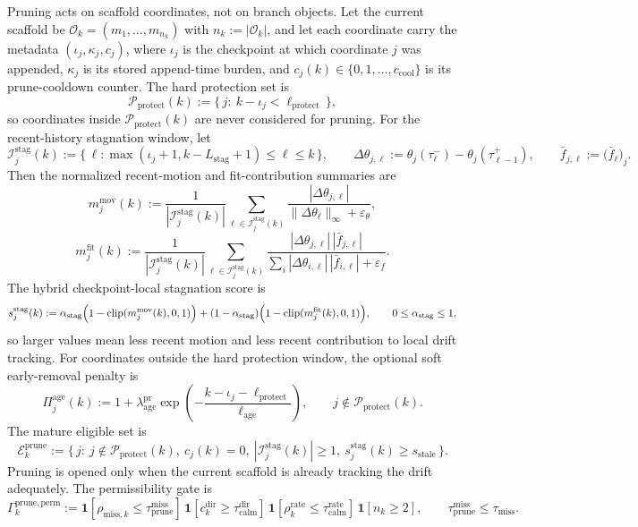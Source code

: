 \documentclass[11pt]{article}
\begin{document}
Pruning acts on scaffold coordinates, not on branch objects. Let the current scaffold be \(\mathcal O_k=(m_1,\dots,m_{n_k})\) with \(n_k:=|\mathcal O_k|\), and let each coordinate carry the metadata \((\iota_j,\kappa_j,c_j)\), where \(\iota_j\) is the checkpoint at which coordinate \(j\) was appended, \(\kappa_j\) is its stored append-time burden, and \(c_j(k)\in\{0,1,\dots,c_{\mathrm{cool}}\}\) is its prune-cooldown counter. The hard protection set is
\[
\mathcal P_{\mathrm{protect}}(k)
:=
\{\,j:\ k-\iota_j<\ell_{\mathrm{protect}}\,\},
\]
so coordinates inside \(\mathcal P_{\mathrm{protect}}(k)\) are never considered for pruning. For the recent-history stagnation window, let
\[
\mathcal I_j^{\mathrm{stag}}(k)
:=
\{\,\ell:\max(\iota_j+1,k-L_{\mathrm{stag}}+1)\le \ell\le k\,\},
\qquad
\Delta\theta_{j,\ell}
:=
\theta_j(\tau_\ell^-)-\theta_j(\tau_{\ell-1}^+),
\qquad
\bar f_{j,\ell}
:=
\bigl(\bar f_\ell\bigr)_j.
\]
Then the normalized recent-motion and fit-contribution summaries are
\[
m_j^{\mathrm{mov}}(k)
:=
\frac{1}{|\mathcal I_j^{\mathrm{stag}}(k)|}
\sum_{\ell\in\mathcal I_j^{\mathrm{stag}}(k)}
\frac{|\Delta\theta_{j,\ell}|}{\|\Delta\theta_\ell\|_\infty+\varepsilon_\theta},
\]
\[
m_j^{\mathrm{fit}}(k)
:=
\frac{1}{|\mathcal I_j^{\mathrm{stag}}(k)|}
\sum_{\ell\in\mathcal I_j^{\mathrm{stag}}(k)}
\frac{|\Delta\theta_{j,\ell}|\,|\bar f_{j,\ell}|}{\sum_i |\Delta\theta_{i,\ell}|\,|\bar f_{i,\ell}|+\varepsilon_f}.
\]
The hybrid checkpoint-local stagnation score is
\[
s_j^{\mathrm{stag}}(k)
:=
\alpha_{\mathrm{stag}}
\Bigl(1-\operatorname{clip}(m_j^{\mathrm{mov}}(k),0,1)\Bigr)
+
(1-\alpha_{\mathrm{stag}})
\Bigl(1-\operatorname{clip}(m_j^{\mathrm{fit}}(k),0,1)\Bigr),
\qquad
0\le \alpha_{\mathrm{stag}}\le 1,
\]
so larger values mean less recent motion and less recent contribution to local drift tracking. For coordinates outside the hard protection window, the optional soft early-removal penalty is
\[
\Pi_j^{\mathrm{age}}(k)
:=
1+\lambda_{\mathrm{age}}^{\mathrm{pr}}
\exp\!\left(
-\frac{k-\iota_j-\ell_{\mathrm{protect}}}{\ell_{\mathrm{age}}}
\right),
\qquad
j\notin\mathcal P_{\mathrm{protect}}(k).
\]
The mature eligible set is
\[
\mathcal E_k^{\mathrm{prune}}
:=
\{\,j:\ j\notin\mathcal P_{\mathrm{protect}}(k),\ c_j(k)=0,\ |\mathcal I_j^{\mathrm{stag}}(k)|\ge 1,\ s_j^{\mathrm{stag}}(k)\ge s_{\mathrm{stale}}\,\}.
\]
Pruning is opened only when the current scaffold is already tracking the drift adequately. The permissibility gate is
\[
\Gamma_k^{\mathrm{prune,perm}}
:=
\mathbf 1[\rho_{\mathrm{miss},k}\le \tau_{\mathrm{prune}}^{\mathrm{miss}}]\,
\mathbf 1[c_k^{\mathrm{dir}}\ge \tau_{\mathrm{calm}}^{\mathrm{dir}}]\,
\mathbf 1[\rho_k^{\mathrm{rate}}\le \tau_{\mathrm{calm}}^{\mathrm{rate}}]\,
\mathbf 1[n_k\ge 2],
\qquad
\tau_{\mathrm{prune}}^{\mathrm{miss}}\le \tau_{\mathrm{miss}}.
\]
\end{document}
